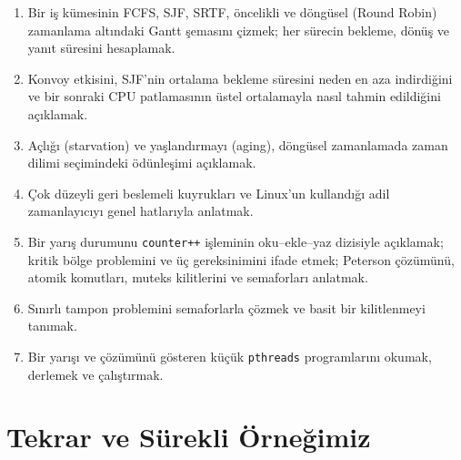 \documentclass[11pt,a4paper]{article}
\newcommand{\cmd}[1]{\texttt{#1}}
\begin{document}
\vspace{0.8em}
\begin{keyidea}
\begin{enumerate}[leftmargin=1.4em]
  \item Bir iş kümesinin FCFS, SJF, SRTF, öncelikli ve döngüsel (Round Robin) zamanlama altındaki Gantt şemasını çizmek; her sürecin bekleme, dönüş ve yanıt süresini hesaplamak.
  \item Konvoy etkisini, SJF'nin ortalama bekleme süresini neden en aza indirdiğini ve bir sonraki CPU patlamasının üstel ortalamayla nasıl tahmin edildiğini açıklamak.
  \item Açlığı (starvation) ve yaşlandırmayı (aging), döngüsel zamanlamada zaman dilimi seçimindeki ödünleşimi açıklamak.
  \item Çok düzeyli geri beslemeli kuyrukları ve Linux'un kullandığı adil zamanlayıcıyı genel hatlarıyla anlatmak.
  \item Bir yarış durumunu \cmd{counter++} işleminin oku--ekle--yaz dizisiyle açıklamak; kritik bölge problemini ve üç gereksinimini ifade etmek; Peterson çözümünü, atomik komutları, muteks kilitlerini ve semaforları anlatmak.
  \item Sınırlı tampon problemini semaforlarla çözmek ve basit bir kilitlenmeyi tanımak.
  \item Bir yarışı ve çözümünü gösteren küçük \texttt{pthreads} programlarını okumak, derlemek ve çalıştırmak.
\end{enumerate}
\end{keyidea}

\setcounter{tocdepth}{1}
\tableofcontents

\section{Tekrar ve Sürekli Örneğimiz}
\end{document}
